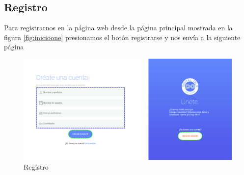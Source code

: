 \subsection{Registro}
Para registrarnos en la p\'agina web desde la p\'agina principal mostrada en la figura \ref{fig:inicioone} presionamos el bot\'on registrarse y nos env\'ia a la siguiente p\'agina
\begin{figure}[h!]
	\centering
	\includegraphics[width=1\linewidth, height=0.4\textheight]{imagenes/registro}
	\caption[Registro.]{Registro}
	\label{fig:inicioThree}
\end{figure}

